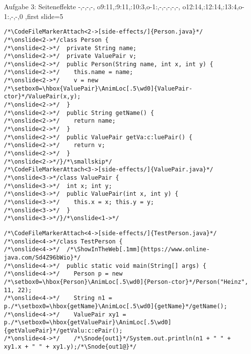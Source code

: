 {\begin{frame}[fragile,t]{Aufgabe 3: Seiteneffekte}
{{    -,-,-,-, %
    o9:{11},:9:{11},:10:{3},o-1:{},-,-,-,-,-, %
    o12:{14},:12:{14},:13:{4},o-1:{},-,-,0
},first slide=5}
\begin{verbatim}
/*\CodeFileMarkerAttach<2->[side-effects/]{Person.java}*/
/*\onslide<2->*/class Person {
/*\onslide<2->*/  private String name;
/*\onslide<2->*/  private ValuePair v;
/*\onslide<2->*/  public Person(String name, int x, int y) {
/*\onslide<2->*/    this.name = name;
/*\onslide<2->*/    v = new /*\setbox0=\hbox{ValuePair}\AnimLoc[.5\wd0]{ValuePair-ctor}*/ValuePair(x,y);
/*\onslide<2->*/  }
/*\onslide<2->*/  public String getName() {
/*\onslide<2->*/    return name;
/*\onslide<2->*/  }
/*\onslide<2->*/  public ValuePair getVa:c:luePair() {
/*\onslide<2->*/    return v;
/*\onslide<2->*/  }
/*\onslide<2->*/}/*\smallskip*/
/*\CodeFileMarkerAttach<3->[side-effects/]{ValuePair.java}*/
/*\onslide<3->*/class ValuePair {
/*\onslide<3->*/  int x; int y;
/*\onslide<3->*/  public ValuePair(int x, int y) {
/*\onslide<3->*/    this.x = x; this.y = y;
/*\onslide<3->*/  }
/*\onslide<3->*/}/*\onslide<1->*/
\end{verbatim}
\endAnimateCode
{}
\begin{verbatim}
/*\CodeFileMarkerAttach<4->[side-effects/]{TestPerson.java}*/
/*\onslide<4->*/class TestPerson {
/*\onslide<4->*/  /*\ShowInTheWeb[.1mm]{https://www.online-java.com/Sd4Z96bWio}*/
/*\onslide<4->*/  public static void main(String[] args) {
/*\onslide<4->*/    Person p = new /*\setbox0=\hbox{Person}\AnimLoc[.5\wd0]{Person-ctor}*/Person("Heinz", 11, 22);
/*\onslide<4->*/    String n1 = p./*\setbox0=\hbox{getName}\AnimLoc[.5\wd0]{getName}*/getName();
/*\onslide<4->*/    ValuePair xy1 = p./*\setbox0=\hbox{getValuePair}\AnimLoc[.5\wd0]{getValuePair}*/getValu:c:ePair();
/*\onslide<4->*/    /*\Snode{out1}*/System.out.println(n1 + " " + xy1.x + " " + xy1.y);/*\Snode{out1@}*/

\end{verbatim}
\end{frame}}

